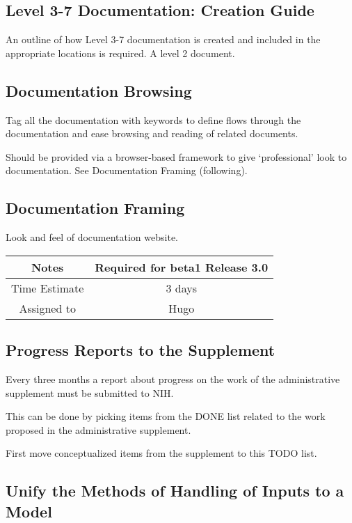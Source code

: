 \documentclass[12pt]{article}
\begin{document}
\subsection{Level 3-7 Documentation: Creation Guide}

An outline of how Level 3-7 documentation is created and included in
the appropriate locations is required.  A level 2 document.


\subsection{Documentation Browsing}

Tag all the documentation with keywords to define flows through the
documentation and ease browsing and reading of related documents.

Should be provided via a browser-based framework to give `professional' look to documentation. See Documentation Framing (following).


\subsection{Documentation Framing}

Look and feel of documentation website.

{
  \vspace{5mm}
  \centering
  \begin{tabular}{|c|c|}
    \hline
    Notes
    & Required for beta1 Release 3.0 \\
    \hline
    Time Estimate
    & 3 days \\
    \hline
    Assigned to
    & Hugo \\
    \hline
  \end{tabular}
}


\subsection{Progress Reports to the Supplement}

Every three months a report about progress on the work of the
administrative supplement must be submitted to NIH.

This can be done by picking items from the DONE list related to the
work proposed in the administrative supplement.

First move conceptualized items from the supplement to this TODO list.


\subsection{Unify the Methods of Handling of Inputs to a Model}
\end{document}
